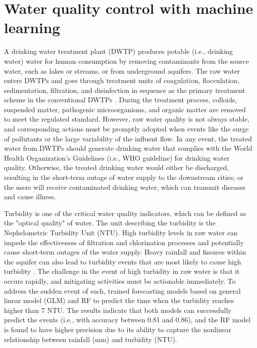 \section{Water quality control with machine learning}
 
A drinking water treatment plant (DWTP) produces potable (i.e., drinking water) water for human consumption by removing contaminants from the source water, such as lakes or streams, or from underground aquifers. The raw water enters DWTPs and goes through treatment units of coagulation, flocculation, sedimentation, filtration, and disinfection in sequence as the primary treatment scheme in the conventional DWTPs \citep{liRecentAdvancesArtificial2021}. During the treatment process, colloids, suspended matter, pathogenic microorganisms, and organic matter are removed to meet the regulated standard. However, raw water quality is not always stable, and corresponding actions must be promptly adopted when events like the surge of pollutants or the large variability of the influent flow. In any event, the treated water from DWTPs should generate drinking water that complies with the World Health Organization's Guidelines (i.e., WHO guideline) for drinking water quality. Otherwise, the treated drinking water would either be discharged,  resulting in the short-term outage of water supply to the downstream cities; or the users will receive contaminated drinking water, which can transmit diseases and cause illness.


Turbidity is one of the critical water quality indicators, which can be defined as the "optical quality" of water. The unit describing the turbidity is the Nephelometric Turbidity Unit (NTU). High turbidity levels in raw water can impede the effectiveness of filtration and chlorination processes and potentially cause short-term outages of the water supply. Heavy rainfall and fissures within the aquifer can also lead to turbidity events that are most likely to cause high turbidity \citep{worldhealthorganizationWaterQualityHealth2017}. The challenge in the event of high turbidity in raw water is that it occurs rapidly, and mitigating activities must be actionable immediately. To address the sudden event of such, \citet{stevensonAdvancedTurbidityPrediction2019} trained forecasting models based on general linear model (GLM) and RF to predict the time when the turbidity reaches higher than 7 NTU. The results indicate that both models can successfully predict the events (i.e., with accuracy between 0.81 and 0.86), and the RF model is found to have higher precision due to its ability to capture the nonlinear relationship between rainfall (mm) and turbidity (NTU).

